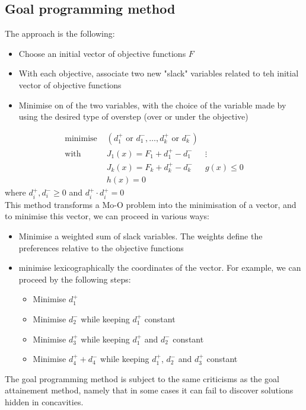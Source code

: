 \documentclass{book}
\begin{document}
\subsection{Goal programming method}
The approach is the following:
\begin{itemize}
    \item Choose an initial vector of objective functions $F$ 
    \item With each objective, associate two new "slack" variables related to teh initial vector of objective functions 
    \item Minimise on of the two variables, with the choice of the variable made by using the desired type of overstep (over or under the objective)
\end{itemize}
\begin{align*}
    \text{minimise } & (d_1^+ \text{ or } d_1^-,\dots,d_k^+ \text{ or } d_k^-)\\
    \text{with } & J_1(x) = F_1 + d_1^+-d_1^-
    & \vdots \\
    & J_k(x) = F_k + d_k^+-d_k^-
    & g(x)\leq 0 \\ 
    & h(x) = 0 
\end{align*}
where $d_i^+,d_i^- \geq 0$ and $d_i^+\cdot d_i^+ = 0$\\ 
This method transforms a Mo-O problem into the minimisation of a vector, and to minimise this vector, we can proceed in various ways: 
\begin{itemize}
    \item Minimise a weighted sum of slack variables. The weights define the preferences relative to the objective functions 
        \item minimise lexicographically the coordinates of the vector. For example, we can proceed by the following steps: 
            \begin{itemize}
                \item Minimise $d_1^+$
                \item Minimise $d_2^-$ while keeping $d_1^+$ constant
                \item Minimise $d_3^+$ while keeping $d_1^+$ and $d_2^-$ constant
                \item Minimise $d_4^++d_4^-$ while keeping $d_1^+$, $d_2^-$ and $d_3^+$ constant
            \end{itemize}
\end{itemize}
The goal programming method is subject to the same criticisms as the goal attainement method, namely that in some cases it can fail to discover solutions hidden in concavities.
\end{document}
